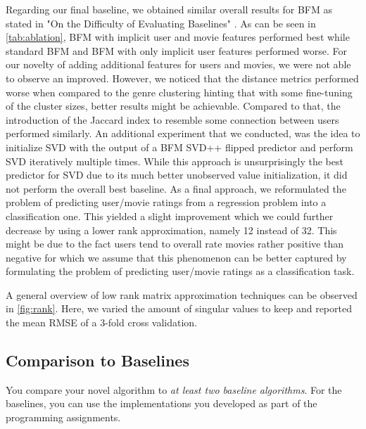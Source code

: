 \documentclass[10pt,conference,compsocconf]{IEEEtran}
\begin{document}
    Regarding our final baseline, we obtained similar overall results for BFM as stated in "On the Difficulty of Evaluating Baselines" \cite{rendle_difficulty_2019}.
    As can be seen in \cref{tab:ablation}, BFM with implicit user and movie features performed best while standard BFM and BFM with only implicit user features performed worse.
    For our novelty of adding additional features for users and movies, we were not able to observe an improved.
    However, we noticed that the distance metrics performed worse when compared to the genre clustering hinting that with some fine-tuning of the cluster sizes, better results might be achievable.
    Compared to that, the introduction of the Jaccard index to resemble some connection between users performed similarly.
    An additional experiment that we conducted, was the idea to initialize SVD with the output of a BFM SVD++ flipped predictor and perform SVD iteratively multiple times.
    While this approach is unsurprisingly the best predictor for SVD due to its much better unobserved value initialization, it did not perform the overall best baseline.
    As a final approach, we reformulated the problem of predicting user/movie ratings from a regression problem into a classification one.
    This yielded a slight improvement which we could further decrease by using a lower rank approximation, namely 12 instead of 32.
    This might be due to the fact users tend to overall rate movies rather positive than negative for which we assume that this phenomenon can be better captured by formulating the problem of predicting user/movie ratings as a classification task.

    A general overview of low rank matrix approximation techniques can be observed in \cref{fig:rank}.
    Here, we varied the amount of singular values to keep and reported the mean RMSE of a 3-fold cross validation.

    \subsection{Comparison to Baselines}

    You compare your novel algorithm to \emph{at least two baseline
    algorithms}. For the baselines, you can use the implementations you
    developed as part of the programming assignments.
\end{document}
